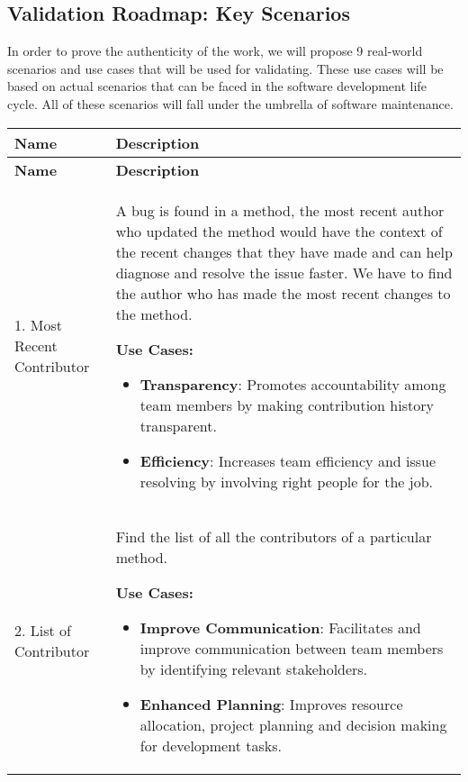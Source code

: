 \subsection{Validation Roadmap: Key Scenarios}\label{ch3:validation_roadmap}

In order to prove the authenticity of the work, we will propose 9 real-world scenarios and use cases that will be used for validating. These use cases will be based on actual scenarios that can be faced in the software development life cycle. All of these scenarios will fall under the umbrella of software maintenance.

\vspace{1cm} 
\noindent
\begin{longtable}{|m{4cm}|m{10cm}|}
\hline
\textbf{Name} & \textbf{Description} \\ \hline
\endfirsthead
\hline
\textbf{Name} & \textbf{Description} \\ \hline
\endhead
\hline
\endfoot
\endlastfoot

1. Most Recent Contributor & A bug is found in a method, the most recent author who updated the method would have the context of the recent changes that they have made and can help diagnose and resolve the issue faster. We have to find the author who has made the most recent changes to the method.

\textbf{Use Cases:}
\begin{itemize}
	\item \textbf{Transparency}: Promotes accountability among team members by making contribution history transparent.
	\item \textbf{Efficiency}: Increases team efficiency and issue resolving by involving right people for the job.
\end{itemize}
\\ \hline

2. List of Contributor & Find the list of all the contributors of a particular method.

\textbf{Use Cases:}
\begin{itemize}
	\item \textbf{Improve Communication}: Facilitates and improve communication between team members by identifying relevant stakeholders.
	\item \textbf{Enhanced Planning}: Improves resource allocation, project planning and decision making for development tasks.
\end{itemize}
\\ \hline


\end{longtable}
